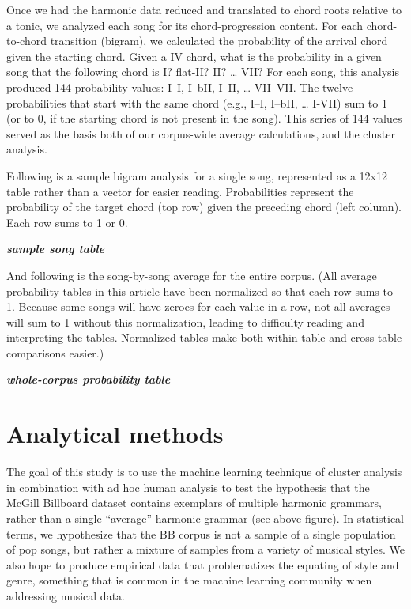 Once we had the harmonic data reduced and translated to chord roots relative to a tonic, we analyzed each song for its chord-progression content. For each chord-to-chord transition (bigram), we calculated the probability of the arrival chord given the starting chord. Given a IV chord, what is the probability in a given song that the following chord is I? flat-II? II? {\ldots} VII? For each song, this analysis produced 144 probability values: I–I, I–bII, I–II, {\ldots} VII–VII. The twelve probabilities that start with the same chord (e.g., I–I, I–bII, {\ldots} I-VII) sum to 1 (or to 0, if the starting chord is not present in the song). This series of 144 values served as the basis both of our corpus-wide average calculations, and the cluster analysis.

Following is a sample bigram analysis for a single song, represented as a 12x12 table rather than a vector for easier reading. Probabilities represent the probability of the target chord (top row) given the preceding chord (left column). Each row sums to 1 or 0.

\textbf{\emph{sample song table}}

And following is the song-by-song average for the entire corpus. (All average probability tables in this article have been normalized so that each row sums to 1. Because some songs will have zeroes for each value in a row, not all averages will sum to 1 without this normalization, leading to difficulty reading and interpreting the tables. Normalized tables make both within-table and cross-table comparisons easier.)

\textbf{\emph{whole-corpus probability table}}

\chapter{Analytical methods}
\label{analyticalmethods}

The goal of this study is to use the machine learning technique of cluster analysis in combination with ad hoc human analysis to test the hypothesis that the McGill Billboard dataset contains exemplars of multiple harmonic grammars, rather than a single ``average'' harmonic grammar (see above figure). In statistical terms, we hypothesize that the BB corpus is not a sample of a single population of pop songs, but rather a mixture of samples from a variety of musical styles. We also hope to produce empirical data that problematizes the equating of style and genre, something that is common in the machine learning community when addressing musical data.

